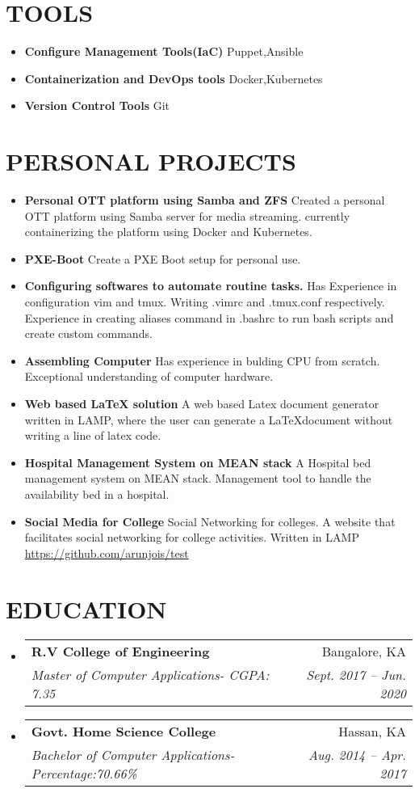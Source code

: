 \documentclass[letterpaper,11pt]{article}
\makeatletter
\newcommand{\resumeItem}[2]{
	\item\small{
		\textbf{#1}{ #2 \vspace{-2pt}}
	}
}
\newcommand{\resumeSubheading}[4]{
	\vspace{-1pt}\item
	\begin{tabular*}{0.97\textwidth}[t]{l@{\extracolsep{\fill}}r}
		\textbf{#1} & #2 \\
		\textit{\small#3} & \textit{\small #4} \\
	\end{tabular*}\vspace{-5pt}
}
\newcommand{\resumeSubItem}[2]{\resumeItem{#1}{#2}\vspace{-4pt}}
\newcommand{\resumeSubHeadingListStart}{\begin{itemize}[leftmargin=*]}
\newcommand{\resumeSubHeadingListEnd}{\end{itemize}}
\makeatother
\begin{document}
	\section{\textbf{TOOLS}}
	\resumeSubHeadingListStart
	\resumeSubItem{Configure Management Tools(IaC)}{Puppet,Ansible}
	\resumeSubItem{Containerization and DevOps tools}{Docker,Kubernetes}	
	\resumeSubItem{Version Control Tools}{Git}
	\resumeSubHeadingListEnd
	\section{\textbf{PERSONAL PROJECTS}}
	\resumeSubHeadingListStart
	\resumeSubItem{Personal OTT platform using Samba and ZFS}{Created a personal OTT 
	platform using Samba server for media streaming. currently containerizing the 
	platform using Docker and Kubernetes. }
	\resumeSubItem{PXE-Boot}{Create a PXE Boot setup for personal use.}
	\resumeSubItem{Configuring softwares to automate routine tasks.}{Has Experience in 
	configuration vim and tmux. Writing .vimrc and .tmux.conf respectively. Experience in 
	creating aliases command in .bashrc to run bash scripts and create custom commands.}
	\resumeSubItem{Assembling Computer}{Has experience in bulding CPU from scratch. 
	Exceptional understanding of computer hardware.}
	\resumeSubItem{Web based LaTeX solution}
	{A web based Latex document generator written in LAMP, where the user can generate 
	a \LaTeX  document without writing a line of latex code. }
	\resumeSubItem{Hospital Management System on MEAN stack}
	{A Hospital bed management system on MEAN stack. Management tool to handle the 
	availability bed in a hospital.}
	\resumeSubItem{Social Media for College}
	{Social Networking for colleges. A website that facilitates social networking for 
		college activities. Written in LAMP \href{https://github.com/arunjois/test} 
		{https://github.com/arunjois/test}}
	\resumeSubHeadingListEnd
	\section{\textbf{EDUCATION}}
	\resumeSubHeadingListStart
	\resumeSubheading
	{R.V College of Engineering}{Bangalore, KA}
	{Master of Computer Applications-  CGPA: 7.35}{Sept. 2017 -- Jun. 2020}
	\resumeSubheading
	{Govt. Home Science College}{Hassan, KA}
	{Bachelor of Computer Applications-  Percentage:70.66\% }{Aug. 2014 -- Apr. 2017}
	\resumeSubHeadingListEnd
	
	
	
	
\end{document}
